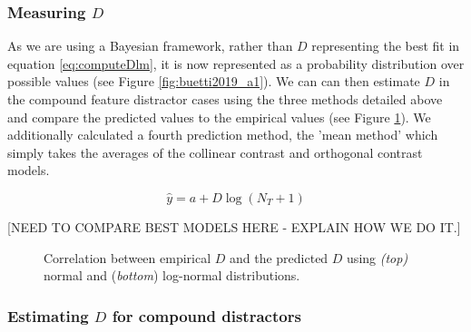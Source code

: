 \documentclass[smallextended]{svjour3}       %
\begin{document}
\subsubsection{Measuring $D$}

As we are using a Bayesian framework, rather than $D$ representing the best fit in equation \ref{eq:computeDlm}, it is now represented as a probability distribution over possible values (see Figure \ref{fig:buetti2019_a1}). We can can then estimate $D$ in the compound feature distractor cases using the three methods detailed above and compare the predicted values to the empirical values (see Figure \ref{fig:buetti2019_D}). We additionally calculated a fourth prediction method, the 'mean method' which simply takes the averages of the collinear contrast and orthogonal contrast models.

\begin{equation}
\hat{y} = a + D\log(N_T + 1)
\label{eq:computeDlm}
\end{equation}

[NEED TO COMPARE BEST MODELS HERE - EXPLAIN HOW WE DO IT.]

\begin{figure}
\centering
{}
\caption{Correlation between empirical $D$ and the predicted $D$ using \textit{(top)} normal and (\textit{bottom}) log-normal distributions.}
\label{fig:buetti2019_D}
\end{figure}

\subsubsection{Estimating $D$ for compound distractors}
\end{document}
